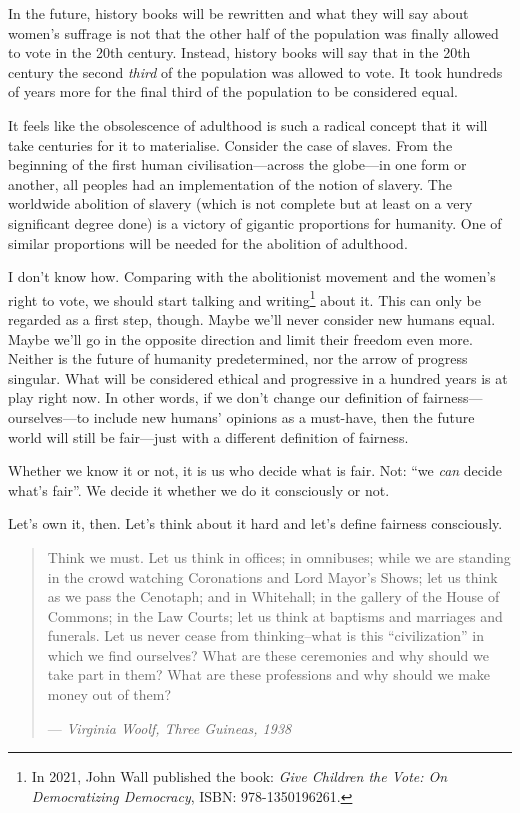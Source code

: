 In the future, history books will be rewritten and what they will say about women’s suffrage is not that the other half of the population was finally allowed to vote in the 20th century. Instead, history books will say that in the 20th century the second \emph{third} of the population was allowed to vote. It took hundreds of years more for the final third of the population to be considered equal.

It feels like the obsolescence of adulthood is such a radical concept that it will take centuries for it to materialise. Consider the case of slaves. From the beginning of the first human civilisation—across the globe—in one form or another, all peoples had an implementation of the notion of slavery. The worldwide abolition of slavery (which is not complete but at least on a very significant degree done) is a victory of gigantic proportions for humanity. One of similar proportions will be needed for the abolition of adulthood.

I don’t know how. Comparing with the abolitionist movement and the women’s right to vote, we should start talking and writing\footnote{In 2021, John Wall published the book: \emph{Give Children the Vote: On Democratizing Democracy}, ISBN: 978-1350196261.} about it. This can only be regarded as a first step, though. Maybe we’ll never consider new humans equal. Maybe we’ll go in the opposite direction and limit their freedom even more. Neither is the future of humanity predetermined, nor the arrow of progress singular. What will be considered ethical and progressive in a hundred years is at play right now. In other words, if we don’t change our definition of fairness—ourselves—to include new humans’ opinions as a must-have, then the future world will still be fair—just with a different definition of fairness.

Whether we know it or not, it is us who decide what is fair. Not: “we \emph{can} decide what’s fair”. We decide it whether we do it consciously or not.

Let’s own it, then. Let’s think about it hard and let’s define fairness consciously.

\begin{quote}
    Think we must. Let us think in offices; in omnibuses; while we are standing in the crowd watching Coronations and Lord Mayor’s Shows; let us think as we pass the Cenotaph; and in Whitehall; in the gallery of the House of Commons; in the Law Courts; let us think at baptisms and marriages and funerals. Let us never cease from thinking–what is this “civilization” in which we find ourselves? What are these ceremonies and why should we take part in them? What are these professions and why should we make money out of them?

    — \emph{Virginia Woolf, Three Guineas, 1938}
\end{quote}

